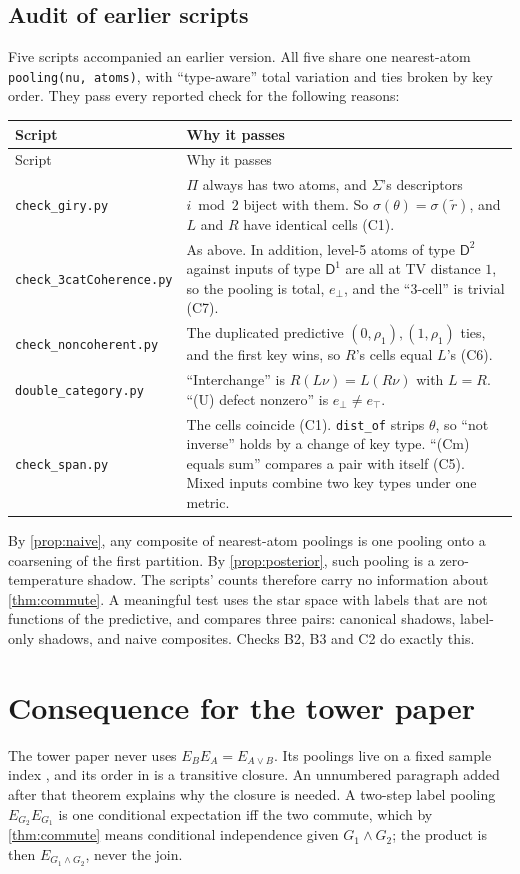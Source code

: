 \documentclass[11pt]{article}
\theoremstyle{definition}
\newcommand{\D}{\mathsf D}
\newcommand{\ebot}{e_{\perp}}
\newcommand{\etop}{e_{\top}}
\newcommand{\rr}{\tilde r}
\begin{document}
\subsection{Audit of earlier scripts}
Five scripts accompanied an earlier version. All five share one nearest-atom \texttt{pooling(nu, atoms)}, with ``type-aware'' total
variation and ties broken by key order. They pass every reported check for the following reasons:
\begin{longtable}{>{\raggedright}p{3.7cm}>{\raggedright\arraybackslash}p{11cm}}
\toprule Script & Why it passes\\\midrule\endfirsthead\toprule Script & Why it passes\\\midrule\endhead
\texttt{check\_giry.py} & $\Pi$ always has two atoms, and $\Sigma$'s descriptors $i\bmod2$ biject with them. So $\sigma(\theta)=\sigma(\rr)$,
  and $L$ and $R$ have identical cells (C1).\\
\texttt{check\_3cat\-Coherence.py} & As above. In addition, level-5 atoms of type $\D^2$ against inputs of type $\D^1$ are all at TV
  distance $1$, so the pooling is total, $\ebot$, and the ``3-cell'' is trivial (C7).\\
\texttt{check\_non\-coherent.py} & The duplicated predictive $(0,\rho_1),(1,\rho_1)$ ties, and the first key wins, so $R$'s cells equal
  $L$'s (C6).\\
\texttt{double\_\-category.py} & ``Interchange'' is $R(L\nu)=L(R\nu)$ with $L=R$. ``(U) defect nonzero'' is $\ebot\ne\etop$.\\
\texttt{check\_span.py} & The cells coincide (C1). \texttt{dist\_of} strips $\theta$, so ``not inverse'' holds by a change of key type.
  ``(Cm) equals sum'' compares a pair with itself (C5). Mixed inputs combine two key types under one metric.\\
\bottomrule
\end{longtable}
By \cref{prop:naive}, any composite of nearest-atom poolings is one pooling onto a coarsening of the first partition. By
\cref{prop:posterior}, such pooling is a zero-temperature shadow. The scripts' counts therefore carry no information about
\cref{thm:commute}. A meaningful test uses the star space with labels that are not functions of the predictive, and compares three
pairs: canonical shadows, label-only shadows, and naive composites. Checks B2, B3 and C2 do exactly this.

\section{Consequence for the tower paper}\label{sec:tower-remark}
The tower paper \cite{Tower} never uses $E_BE_A=E_{A\vee B}$. Its poolings live on a fixed sample index \cite[Def.~13.13]{Tower}, and
its order in \cite[Thm.~13.16]{Tower} is a transitive closure. An unnumbered paragraph added after that theorem explains why the
closure is needed. A two-step label pooling $E_{G_2}E_{G_1}$ is one conditional expectation iff the two commute, which by
\cref{thm:commute} means conditional independence given $G_1\wedge G_2$; the product is then $E_{G_1\wedge G_2}$, never the join.
\end{document}
